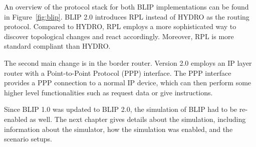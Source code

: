 An overview of the protocol stack for both BLIP implementations can be found in Figure~\ref{fig:blip}. BLIP 2.0 introduces RPL instead of HYDRO as the routing protocol. Compared to HYDRO, RPL employs a more sophisticated way to discover topological changes and react accordingly. Moreover, RPL is more standard compliant than HYDRO.


The second main change is in the border router. Version 2.0 employs an IP layer router with a Point-to-Point Protocol (PPP) interface. The PPP interface provides a PPP connection to a normal IP device, which can then perform some higher level functionalities such as request data or give instructions.

Since BLIP 1.0 was updated to BLIP 2.0, the simulation of BLIP had to be re-enabled as well. The next chapter gives details about the simulation, including information about the simulator, how the simulation was enabled, and the scenario setups.
